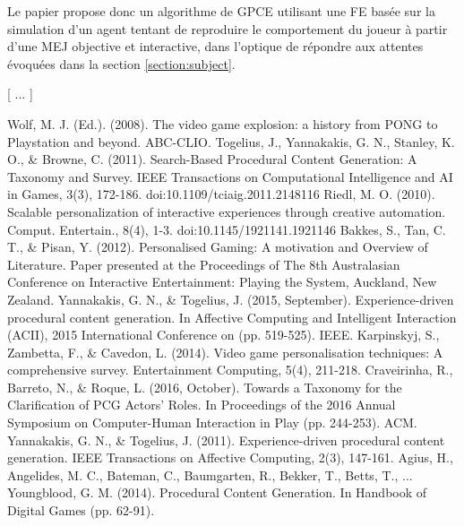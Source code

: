 \documentclass[a4paper,11pt]{article}
\begin{document}
        Le papier propose donc un algorithme de GPCE utilisant une FE basée sur la simulation d'un agent tentant de reproduire le comportement du joueur à partir d'une MEJ objective et interactive, dans l'optique de répondre aux attentes évoquées dans la section \ref{section:subject}.
        
        \vspace{2em}
        \centerline{[ ... ]}
        \vspace{4em}
  
    \begin{thebibliography}{99}
        Wolf, M. J. (Ed.). (2008). The video game explosion: a history from PONG to Playstation and beyond. ABC-CLIO.
        Togelius, J., Yannakakis, G. N., Stanley, K. O., \& Browne, C. (2011). Search-Based Procedural Content Generation: A Taxonomy and Survey. IEEE Transactions on Computational Intelligence and AI in Games, 3(3), 172-186. doi:10.1109/tciaig.2011.2148116     
        Riedl, M. O. (2010). Scalable personalization of interactive experiences through creative automation. Comput. Entertain., 8(4), 1-3. doi:10.1145/1921141.1921146
        Bakkes, S., Tan, C. T., \& Pisan, Y. (2012). Personalised Gaming: A motivation and Overview of Literature. Paper presented at the Proceedings of The 8th Australasian Conference on Interactive Entertainment: Playing the System, Auckland, New Zealand. 
        Yannakakis, G. N., \& Togelius, J. (2015, September). Experience-driven procedural content generation. In Affective Computing and Intelligent Interaction (ACII), 2015 International Conference on (pp. 519-525). IEEE.
        Karpinskyj, S., Zambetta, F., \& Cavedon, L. (2014). Video game personalisation techniques: A comprehensive survey. Entertainment Computing, 5(4), 211-218.
        Craveirinha, R., Barreto, N., \& Roque, L. (2016, October). Towards a Taxonomy for the Clarification of PCG Actors' Roles. In Proceedings of the 2016 Annual Symposium on Computer-Human Interaction in Play (pp. 244-253). ACM.
        Yannakakis, G. N., \& Togelius, J. (2011). Experience-driven procedural content generation. IEEE Transactions on Affective Computing, 2(3), 147-161.
        Agius, H., Angelides, M. C., Bateman, C., Baumgarten, R., Bekker, T., Betts, T., ... Youngblood, G. M. (2014). Procedural Content Generation. In Handbook of Digital Games (pp. 62-91). 

\end{thebibliography}
\end{document}
